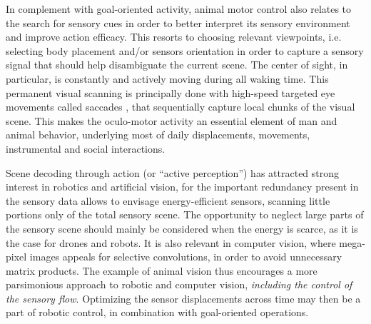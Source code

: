 \documentclass[12pt,twoside,openright]{article}
\begin{document}
In complement with goal-oriented activity, animal motor control also relates to the search for sensory cues in order to better interpret its sensory environment and improve action efficacy. This resorts to choosing relevant viewpoints, i.e. selecting body placement and/or sensors orientation in order to capture a sensory signal that should help disambiguate the current scene. 
The center of sight, in particular, is constantly and actively moving during all waking time. 
This permanent visual scanning is principally done with high-speed targeted eye movements called saccades \citep{yarbus1967eye}, that sequentially capture local chunks of the visual scene. 
This makes the oculo-motor activity an essential element of man and animal behavior, underlying most of daily displacements, movements, instrumental and social interactions. 


% 

Scene decoding through action (or ``active perception'') has attracted strong interest in robotics and artificial vision, for the important redundancy present in the sensory data allows to envisage energy-efficient sensors, scanning little portions only of the total sensory scene.
The opportunity to neglect large parts of the sensory scene should mainly be considered when the energy is scarce, as it is the case for drones and robots. 
It is also relevant in computer vision, where mega-pixel images appeals for selective convolutions, in order to avoid unnecessary matrix products. 
The example of animal vision thus encourages a more parsimonious approach to robotic and computer vision, \emph{including the control of the sensory flow}. 
Optimizing the sensor displacements across time may then be a part of robotic control, in combination with goal-oriented operations. 
\end{document}
